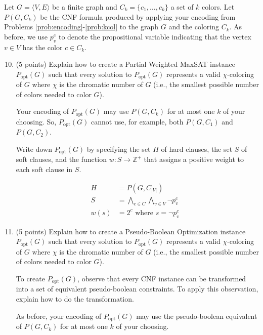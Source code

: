 \documentclass{article}
\newenvironment{solution}{\color{blue} \em }{}
\begin{document}
Let $G = \langle V, E\rangle$ be a finite graph and $C_k = \{ c_1, \ldots, c_k \}$ a set of $k$ colors.
Let $P(G, C_k)$ be the CNF formula produced by applying your encoding from Problems \ref{prob:encoding}-\ref{prob:kcol}
to the graph $G$ and the coloring $C_k$.
As before, we use $p_v^c$ to denote the propositional variable indicating that the vertex $v\in V$ has the color $c\in C_k$.


\begin{enumerate}
	\setcounter{enumi}{9}

	\item (5 points) Explain how to create a Partial Weighted MaxSAT instance $P_{\text{opt}}(G)$
	such that every solution to $P_{\text{opt}}(G)$ represents a valid $\chi$-coloring of $G$ where $\chi$ is
	the chromatic number of $G$ (i.e., the smallest possible number of colors needed to color $G$).

	Your encoding of  $P_{\text{opt}}(G)$ may use $P(G, C_k)$ for at most one $k$ of your choosing.
	So, $P_{\text{opt}}(G)$ cannot use, for example, both $P(G, C_1)$ and $P(G, C_2)$.

	Write down  $P_{\text{opt}}(G)$ by specifying the set $H$ of hard clauses,
	the set $S$ of soft clauses, and the function $w : S \rightarrow \mathbb{Z^+}$ that assigns a positive weight to each soft clause in $S$.

\begin{solution}
	\begin{align*}
        H    	&=    P(G, C_{|V|}) \\
        S    	&=     \bigwedge_{c \in C} \bigwedge_{v \in V} \neg p^c_v \\
        w(s)    &=    2^c \text{ where $s= \neg p_v^c$ }
	\end{align*}
\end{solution}

	\item (5 points)  Explain how to create a Pseudo-Boolean Optimization instance $P_{\text{opt}}(G)$
	such that every solution to $P_{\text{opt}}(G)$ represents a valid $\chi$-coloring of $G$ where $\chi$ is
	the chromatic number of $G$ (i.e., the smallest possible number of colors needed to color $G$).

	To create $P_{\text{opt}}(G)$, observe that every CNF instance
	can be transformed into a set of equivalent pseudo-boolean constraints.
	To apply this observation, explain how to do the transformation.

	As before, your encoding of  $P_{\text{opt}}(G)$ may use the  pseudo-boolean equivalent of  $P(G, C_k)$ for at most one $k$ of your choosing.



\end{enumerate}
\end{document}

